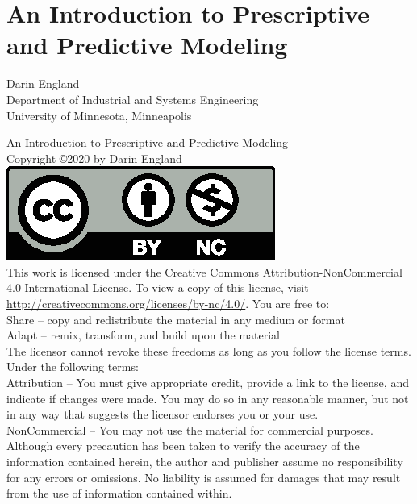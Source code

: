 \documentclass[11pt]{report}
\begin{document}
\chapter*{\Huge \center An Introduction to Prescriptive
  and Predictive Modeling}
\thispagestyle{empty}
\begin{center}
{\large Darin England\\
Department of Industrial and Systems Engineering\\
University of Minnesota, Minneapolis}
\end{center}

\newpage
\noindent
An Introduction to Prescriptive and Predictive Modeling\\
Copyright \copyright 2020 by Darin England\\
\includegraphics[scale=0.8]{by-nc.eps}\\
This work is licensed under the Creative Commons Attribution-NonCommercial 4.0
International License. To view a copy of this license,
visit \url{http://creativecommons.org/licenses/by-nc/4.0/}.
You are free to:\\
Share – copy and redistribute the material in any medium or format\\
Adapt – remix, transform, and build upon the material\\
The licensor cannot revoke these freedoms as long as you follow the license terms.
Under the following terms:\\
Attribution – You must give appropriate credit, provide a link to the license,
and indicate if changes were made. You may do so in any reasonable manner,
but not in any way that suggests the licensor endorses you or your use.\\
NonCommercial – You may not use the material for commercial purposes.\\
Although every precaution has been taken to verify the accuracy of the
information contained herein, the author and publisher assume no
responsibility for any errors or omissions. No liability is assumed
for damages that may result from the use of information contained
within.
\end{document}
